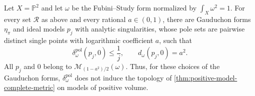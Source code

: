 \begin{proposition}\label{prop:gauduchon-choice-topology-obstruction}
Let $X=\mathbb P^2$ and let $\omega$ be the Fubini--Study form normalized by $\int_X\omega^2=1$. For every set $\mathscr R$ as above and every rational $a\in(0,1)$, there are Gauduchon forms $\eta_\pi$ and ideal models $p_j$ with analytic singularities, whose pole sets are pairwise distinct single points with logarithmic coefficient $a$, such that
\[
 \delta_\omega^{\mathrm{pol}}(p_j,0)\leq\frac1j,
 \qquad d_\omega(p_j,0)=a^2.
\]
All $p_j$ and $0$ belong to $\mathcal M_{(1-a^2)/2}(\omega)$. Thus, for these choices of the Gauduchon forms, $\delta^{\mathrm{pol}}_\omega$ does not induce the topology of \cref{thm:positive-model-complete-metric} on models of positive volume.
\end{proposition}
